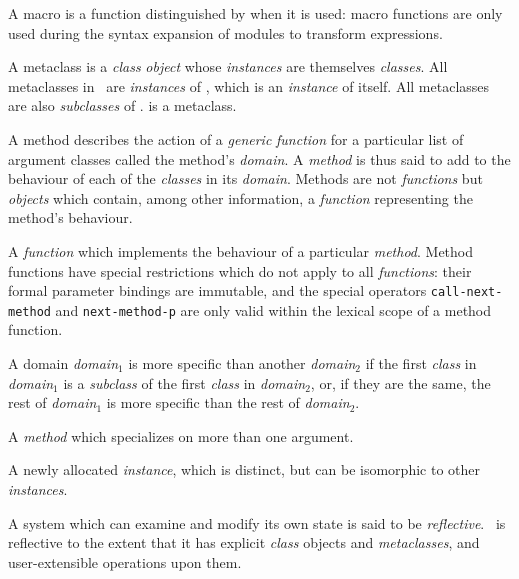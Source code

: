 \begin{optDefinition}
\begin{definitions}
     A macro is a function distinguished
    by when it is used: macro functions are only used during the syntax
    expansion of modules to transform expressions.

      A metaclass is a {\em
        class} {\em object} whose {\em instances} are themselves {\em classes}.
    All metaclasses in \eulisp\ are {\em instances} of , which
    is an {\em instance} of itself.  All metaclasses are also {\em subclasses}
    of .   is a metaclass.

      A method describes the action of
    a {\em generic} {\em function} for a particular list of argument classes
    called the method's {\em domain}.  A {\em method} is thus said to add to the
    behaviour of each of the {\em classes} in its {\em domain}.  Methods are not
    {\em functions} but {\em objects} which contain, among other information, a
    {\em function} representing the method's behaviour.

      A {\em
        function} which implements the behaviour of a particular {\em method}.
    Method functions have special restrictions which do not apply to all {\em
        functions}: their formal parameter bindings are immutable, and the
    special operators {\tt call-next-method} and {\tt next-method-p} are only
    valid within the lexical scope of a method function.

     
     A domain {\em domain$_1$} is more
    specific than another {\em domain$_2$} if the first {\em class} in {\em
        domain$_1$} is a {\em subclass} of the first {\em class} in {\em
        domain$_2$}, or, if they are the same, the rest of {\em domain$_1$} is
    more specific than the rest of {\em domain$_2$}.

      A {\em method} which
    specializes on more than one argument.

     A newly allocated
    {\em instance}, which is distinct, but can be isomorphic to other {\em
        instances}.

      A system which can
    examine and modify its own state is said to be {\em reflective}.  \eulisp\
    is reflective to the extent that it has explicit {\em class} objects and
    {\em metaclasses}, and user-extensible operations upon them.


\end{definitions}
\end{optDefinition}
